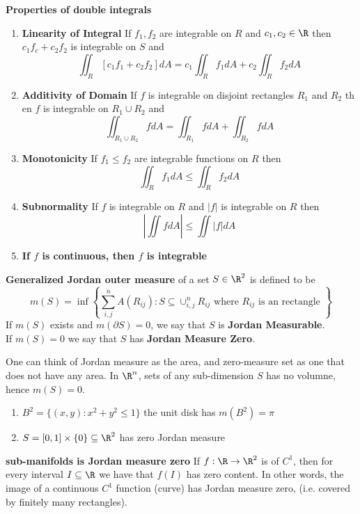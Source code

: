 \documentclass[11pt]{article}
\begin{document}
\begin{theorem*}
  \textbf{Properties of double integrals}
  \begin{enumerate}
    \item \textbf{Linearity of Integral} If $f_1, f_2$ are integrable on $R$ and $c_1, c_2\in\R$ then $c_1f_c + c_2f_2$ is integrable on $S$ and
    \[
      \iint_R [c_1f_1 + c_2f_2]dA = c_1\iint_R f_1 dA + c_2\iint_R f_2 dA
    \]
    \item \textbf{Additivity of Domain} If $f$ is integrable on disjoint rectangles $R_1$ and $R_2$ th en $f$ is integrable on $R_1\cup R_2$ and
    \[
      \iint_{R_1\cup R_2} fdA = \iint_{R_1}fdA + \iint_{R_2} fdA
    \]
    \item \textbf{Monotonicity} If $f_1\leq f_2$ are integrable functions on $R$ then
    \[
      \iint_{R} f_1dA \leq \iint_R f_2 dA
    \]
    \item \textbf{Subnormality} If $f$ is integrable on $R$ and $|f|$ is integrable on $R$ then
    \[
      |\iint fdA | \leq \iint |f|dA
    \]
    \item \textbf{If $f$ is continuous, then $f$ is integrable}
  \end{enumerate}
\end{theorem*}


\begin{defn*}
  \textbf{Generalized Jordan outer measure} of a set $S\in \R^2$ is defined to be
  \[
    m(S) = \inf \left\{ \sum_{i,j}^n A(R_{ij}) : S \subseteq \cup_{i,j}^n R_{ij} \text{ where $R_{ij}$ is an rectangle }\right\}
  \]
  If $m(S)$ exists and $m(\partial S) = 0$, we say that $S$ is \textbf{Jordan Measurable}. \\
  If $m(S)=0$ we say that $S$ has \textbf{Jordan Measure Zero}.

  \begin{rem}
    One can think of Jordan measure as the area, and zero-measure set as one that does not have any area. In $\R^n$, sets of any sub-dimension $S$ has no volumne, hence $m(S) = 0$.
    \begin{enumerate}
      \item $B^2 =  \{ (x,y): x^2 + y^2 \leq 1\}$ the unit disk has $m(B^2)=  \pi$
      \item $S =  [0,1] \times \{ 0\} \subseteq \R^2$ has zero Jordan measure
    \end{enumerate}
  \end{rem}
\end{defn*}

\begin{theorem*}
  \textbf{sub-manifolds is Jordan measure zero} If $f:\R \to \R^2$ is of $C^1$, then for every interval $I\subseteq \R$ we have that $f(I)$ has zero content. In other words, the image of a continuous $C^1$ function (curve) has Jordan measure zero,  (i.e. covered by finitely many rectangles).
\end{theorem*}
\end{document}
